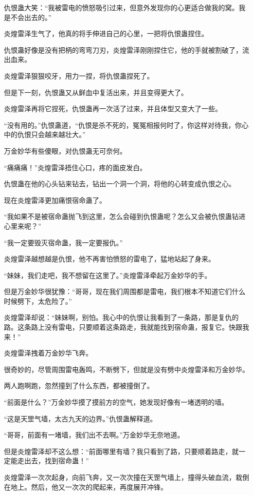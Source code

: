 \begin{this_body}
仇恨蛊大笑：“我被雷电的愤怒吸引过来，但意外发现你的心更适合做我的窝。我是不会出去的。”

炎煌雷泽生气了，他真的将手伸进自己的心里，一把将仇恨蛊捏住。

仇恨蛊好像是没有把柄的弯弯刀刃，炎煌雷泽刚刚捏住它，他的手就被割破了，流出血来。

炎煌雷泽狠狠咬牙，用力一捏，将仇恨蛊捏死了。

但是下一刻，仇恨蛊又从鲜血中复活出来，并且变得更大了。

炎煌雷泽再将它捏死，仇恨蛊再一次活了过来，并且体型又变大了一些。

“没有用的。”仇恨蛊道，“仇恨是杀不死的，冤冤相报何时了，你这样对待我，你心中的仇恨只会越来越壮大。”

万金妙华有些傻眼，对仇恨蛊无可奈何。

“痛痛痛！”炎煌雷泽捂住心口，疼的面皮发白。

仇恨蛊在他的心头钻来钻去，钻出一个洞一个洞，将他的心转变成仇恨之心。

现在炎煌雷泽更加痛恨宿命蛊了。

“我如果不是被宿命蛊抛飞到这里，怎么会碰到仇恨蛊呢？怎么又会被仇恨蛊钻进心里来呢？”

“我一定要毁灭宿命蛊，我一定要报仇。”

炎煌雷泽越想越是仇恨，他不再害怕愤怒的雷电了，猛地站起了身来。

“妹妹，我们走吧，我不想留在这里了。”炎煌雷泽牵起万金妙华的手。

但是万金妙华很犹豫：“哥哥，现在我们周围都是雷电，我们根本不知道它们什么时候劈下，太危险了。”

炎煌雷泽却说：“妹妹啊，别怕。我心中的仇恨让我看到了一条路，那是复仇的路。这条路上没有雷电，只要顺着这条路走，我就能找到宿命蛊，报复它。快跟我来！”

炎煌雷泽拽着万金妙华飞奔。

很奇妙的，尽管周围雷电轰鸣，不断劈下，但就是没有劈中炎煌雷泽和万金妙华。

两人跑啊跑，忽然撞到了什么东西，都被撞倒了。

“前面是什么？”万金妙华摸了摸前方的空气，她发现好像有一堵透明的墙。

“这是天罡气墙，太古九天的边界。”仇恨蛊解释道。

“哥哥，前面有一堵墙，我们出不去啊。”万金妙华无奈地道。

但是炎煌雷泽却不这么想：“前面哪里有墙？我只看到了路，只要顺着路走，就一定能走出去，找到宿命蛊！”

炎煌雷泽一次次起身，向前飞奔，又一次次撞在天罡气墙上，撞得头破血流，栽倒在地上。然后，他又一次次的爬起来，再度展开冲锋。


\end{this_body}
